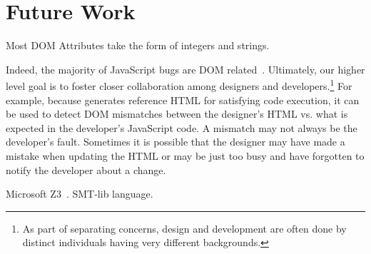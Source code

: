 \section{Future Work}  
Most DOM Attributes take the form of integers and strings.  



Indeed, the majority of JavaScript bugs are DOM related~\cite{frolin2013}.
Ultimately, our higher level goal is to foster closer collaboration among designers and developers.\footnote{As part of separating concerns, design and development are often done by distinct individuals having very different backgrounds.}
For example, because \tool generates reference HTML for satisfying code execution, it can be used to detect DOM mismatches between the designer's HTML vs. what is expected in the developer's JavaScript code.  
A mismatch may not always be the developer's fault.  Sometimes it is possible that the designer may have made a mistake when updating the HTML or may be just too busy and have forgotten to notify the developer about a change.  

Microsoft Z3~\cite{z3}.  SMT-lib language.
